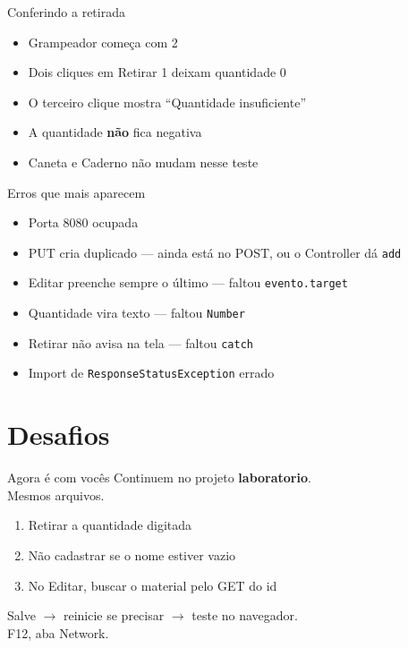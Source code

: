 \documentclass[aspectratio=169,11pt]{beamer}
\begin{document}
\begin{frame}{Conferindo a retirada}
  \begin{itemize}
    \item [ ] Grampeador começa com 2
    \item [ ] Dois cliques em Retirar 1 deixam quantidade 0
    \item [ ] O terceiro clique mostra ``Quantidade insuficiente''
    \item [ ] A quantidade \textbf{não} fica negativa
    \item [ ] Caneta e Caderno não mudam nesse teste
  \end{itemize}
\end{frame}

\begin{frame}{Erros que mais aparecem}
  \begin{itemize}
    \item Porta 8080 ocupada
    \item PUT cria duplicado --- ainda está no POST,
          ou o Controller dá \texttt{add}
    \item Editar preenche sempre o último --- faltou
          \texttt{evento.target}
    \item Quantidade vira texto --- faltou \texttt{Number}
    \item Retirar não avisa na tela --- faltou \texttt{catch}
    \item Import de \texttt{ResponseStatusException} errado
  \end{itemize}
\end{frame}

\section{Desafios}

\begin{frame}{Agora é com vocês}
  Continuem no projeto \textbf{laboratorio}.\\
  Mesmos arquivos.

  \vspace{0.5em}
  \begin{enumerate}
    \item Retirar a quantidade digitada
    \item Não cadastrar se o nome estiver vazio
    \item No Editar, buscar o material pelo GET do id
  \end{enumerate}

  \vspace{0.5em}
  Salve $\rightarrow$ reinicie se precisar $\rightarrow$ teste no navegador.\\
  F12, aba Network.
\end{frame}
\end{document}
